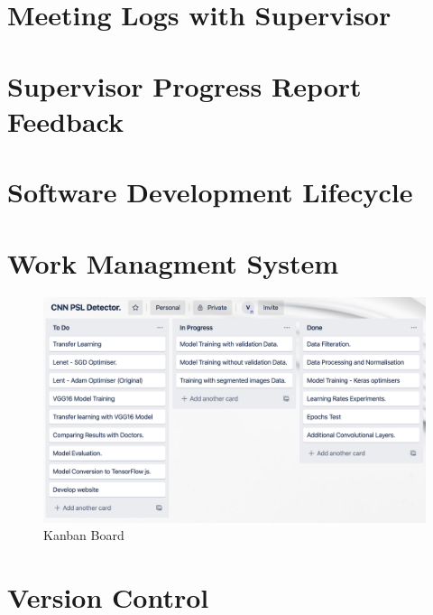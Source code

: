 \section{Meeting Logs with Supervisor}
\section{Supervisor Progress Report Feedback}
\section{Software Development Lifecycle}
\section{Work Managment System}
\begin{figure}[!htp]
    \centering
    \includegraphics[width=15cm]{Images/Kanban Bords.png}
    \caption{Kanban Board}
\end{figure}
\section{Version Control}



